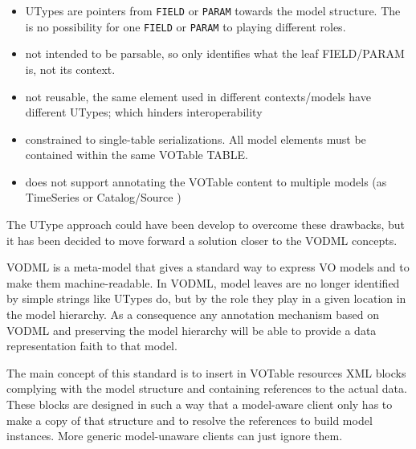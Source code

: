 \begin{itemize}
  \item UTypes are pointers from \texttt{FIELD} or \texttt{PARAM} towards the 
  model structure. The is no possibility for one  \texttt{FIELD} or
  \texttt{PARAM} to playing different roles.
  \item not intended to be parsable, so only identifies what the leaf 
  FIELD/PARAM is, not its context.
  \item not reusable, the same element used in different contexts/models 
  have different UTypes; which hinders interoperability
  \item constrained to single-table serializations. All model elements must 
  be contained within the same VOTable TABLE.
  \item does not support annotating the VOTable content to multiple models 
  (as TimeSeries or Catalog/Source )
\end{itemize}

The UType approach could have been develop to overcome these drawbacks, but it has been decided to move forward a solution closer to the VODML \citep{2018ivoa.spec.0910L} concepts. 

VODML is a meta-model that gives a standard way to express VO models and to make them machine-readable.
In VODML, model leaves are no longer identified by simple strings like UTypes do, but by the role they play in a given location in the model hierarchy.
As a consequence any annotation mechanism based on VODML and preserving the model hierarchy will be able  to provide a data representation faith to that model.

The main concept of this standard is to insert in VOTable resources XML blocks complying with the 
model structure and containing references to the actual data.
These blocks are designed in such a way that a model-aware client only has to make a copy of that structure and to resolve the references  
to build model instances. More generic model-unaware clients can just ignore them. 





